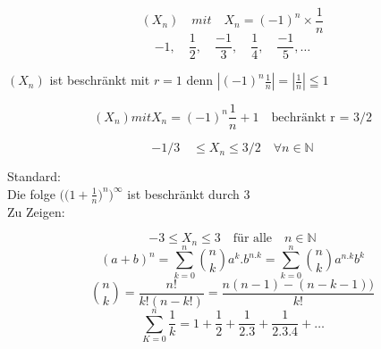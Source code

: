 \begin{example}
    \[(X_n)\quad mit \quad X_n = (-1)^n \times \frac{1}{n} \]
    \[-1 ,\quad \frac{1}{2}, \quad \frac{-1}{3}, \quad \frac{1}{4} ,\quad \frac{-1}{5},\dots \]
\end{example}

\begin{remark}

    $(X_n)$ ist beschränkt mit $r = 1$ denn $|(-1)^n \frac{1}{n}|=|\frac{1}{n}| \leqq 1  $

\end{remark}

\begin{example}
    \[  (X_n) mit X_n = (-1)^n \frac{1}{n}+1 \quad \text{bechränkt r = 3/2}\]

    \[-1/3 \quad \leq X_n \leq 3/2 \quad \forall n \in \mathbb{N} \]
\end{example}
\vfil
\vfil
\begin{example}{Standard:}\\

{Die folge}
$ \bigg(\big(1 + \frac{1}{n} \big)^n \bigg)^\infty$
{ist beschränkt durch 3}\\

Zu Zeigen:

\[ -3 \leq X_n \leq 3 \quad \text{für alle} \quad n \in \mathbb{N} \]
\[ { (a+b)^n = \sum_{k=0}^{n} \binom{n}{k} a^k . b^{n .k} = \sum_{k=0}^{n} \binom{n}{k} a^{n.k} b^k }  \]
\[  \binom{n}{k} = \frac{n!}{k!(n-k!)} =  \frac{n(n-1) -(n-k-1))}{k!} \]
\[  \sum_{K=0}^{n} \frac{1}{k} = 1+ \frac{1}{2} + \frac{1}{2.3} + \frac{1}{2.3.4} + \dots \]
\end{example}


